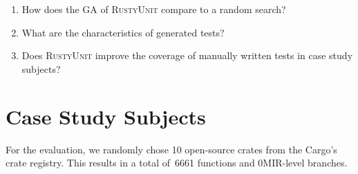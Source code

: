 \documentclass[paper=a4,%
  twoside,%
  BCOR4mm,%
  abstract=true,%
  toc=bibliography,%
  chapterprefix=true,%
  toc=bibliographynumbered,%
  open=right,%
  english,%
  pagesize=pdftex]{scrreprt}
\newcommand{\benchnum}{10\xspace}
\newcommand{\methodsnum}{6661\xspace}
\newcommand{\branches}{0\xspace}
\newcommand{\tech}{\textsc{RustyUnit}\xspace}
\newcommand{\mir}{\ac{MIR}\xspace}
\newcommand{\ga}{\ac{GA}\xspace}
\begin{document}
\begin{enumerate}[start=1, label={\bfseries RQ\arabic*:}]
    \item How does the \ga of \tech compare to a random search?
    \item What are the characteristics of generated tests? 
    
    \item Does \tech improve the coverage of manually written tests in case study subjects?
\end{enumerate} 

\section{Case Study Subjects}
\label{sec:case-study-subjects}
For the evaluation, we randomly chose \benchnum open-source crates from the Cargo's crate registry. This results in a total of~\methodsnum functions and \branches \mir-level branches.
\end{document}
